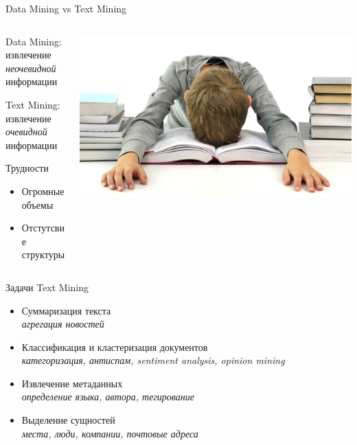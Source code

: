 \documentclass[aspectratio=169]{beamer}
\begin{document}
\begin{frame}{Data Mining vs Text Mining}

	\begin{columns}[T]
    \begin{column}{.5\textwidth}
   	Data Mining: \\ извлечение {\it неочевидной} информации

	\vspace{1em}
	Text Mining: \\ извлечение {\it очевидной} информации

\vspace{1em}
Трудности
\begin{itemize}
\item Огромные объемы
\item Отстутсвие структуры
\end{itemize}
	    
    \end{column}
    \begin{column}{.5\textwidth}
    \vspace{1em}
    \includegraphics[scale=0.06]{images/books.jpg}    
    \end{column}
  \end{columns}

\end{frame}


\begin{frame}{Задачи Text Mining}

\begin{itemize}
\item Суммаризация текста \\
{\it агрегация новостей}
\item Классификация и кластеризация документов \\
{\it категоризация, антиспам, sentiment analysis, opinion mining}
\item Извлечение метаданных \\
{\it определение языка, автора, тегирование}
\item Выделение сущностей \\
{\it места, люди, компании, почтовые адреса}
\end{itemize}

\end{frame}
\end{document}
